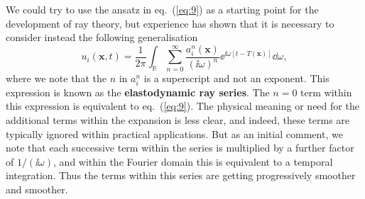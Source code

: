 We could try to use the ansatz in eq.~(\ref{eq:9}) as a 
starting point for the development of ray theory, but experience has shown that it is necessary to consider 
instead the following generalisation
\begin{equation}
u_{i}(\mathbf{x},t)=\frac{1}{2\pi}\int_{\mathbb{R}}\sum_{n=0}^{\infty}\frac{a_{i}^{n}(\mathbf{x})}{(\ii\omega)^{n}}\ee^{\ii\omega[t-T(\mathbf{x})]}\dd\omega,
\label{eq:10}
\end{equation}
where we note that the $n$ in $a_{i}^{n}$ is a superscript and not an exponent. This expression is known as the \textbf{elastodynamic 
ray series}. The $n=0$ term within this expression is equivalent to eq.~(\ref{eq:9}). The physical meaning or need for the additional terms 
within the expansion is less clear, and indeed, these terms are typically ignored within practical applications. But 
as an initial comment, we note that each successive term within the series is multiplied by a further factor of $1/(\ii\omega)$, and within the Fourier domain 
this is equivalent to a temporal integration. Thus the terms within this series are getting progressively smoother and smoother.

